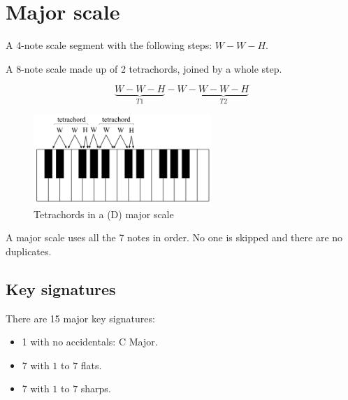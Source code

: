 \section{Major scale}
\begin{definition}[Tetrachord]
    A 4-note scale segment with the following steps: $W-W-H$.
\end{definition}

\begin{definition}
    A 8-note scale made up of 2 tetrachords, joined by a whole step.
\end{definition}

$$\underbrace{W-W-H}_{T1}-W-\underbrace{W-W-H}_{T2}$$

\begin{figure}[h]
    \begin{center}
        \includegraphics[width=0.6\textwidth]{img/tetrachord}
        \caption{Tetrachords in a (D) major scale}
    \end{center}
\end{figure}

A major scale uses all the 7 notes in order. No one is skipped and there are no duplicates.

\subsection{Key signatures}
There are 15 major key signatures:
\begin{itemize}
    \item 1 with no accidentals: C Major.
    \item 7 with $1$ to $7$ flats.
    \item 7 with $1$ to $7$ sharps.
\end{itemize}

